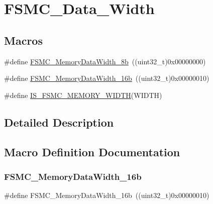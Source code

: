\hypertarget{group___f_s_m_c___data___width}{}\section{F\+S\+M\+C\+\_\+\+Data\+\_\+\+Width}
\label{group___f_s_m_c___data___width}
\subsection*{Macros}
\begin{DoxyCompactItemize}
\item 
\#define \mbox{\hyperlink{group___f_s_m_c___data___width_ga5753e089830f19af70a724766e3c329f}{F\+S\+M\+C\+\_\+\+Memory\+Data\+Width\+\_\+8b}}~((uint32\+\_\+t)0x00000000)
\item 
\#define \mbox{\hyperlink{group___f_s_m_c___data___width_ga65d85c3072e6790ae760ca2248e46df6}{F\+S\+M\+C\+\_\+\+Memory\+Data\+Width\+\_\+16b}}~((uint32\+\_\+t)0x00000010)
\item 
\#define \mbox{\hyperlink{group___f_s_m_c___data___width_ga003d52b62f5950fb041f73f15ce20171}{I\+S\+\_\+\+F\+S\+M\+C\+\_\+\+M\+E\+M\+O\+R\+Y\+\_\+\+W\+I\+D\+TH}}(W\+I\+D\+TH)
\end{DoxyCompactItemize}


\subsection{Detailed Description}


\subsection{Macro Definition Documentation}
\mbox{\label{group___f_s_m_c___data___width_ga65d85c3072e6790ae760ca2248e46df6}} 
\subsubsection{\texorpdfstring{FSMC\_MemoryDataWidth\_16b}{FSMC\_MemoryDataWidth\_16b}}
{\footnotesize\ttfamily \#define F\+S\+M\+C\+\_\+\+Memory\+Data\+Width\+\_\+16b~((uint32\+\_\+t)0x00000010)}

\mbox{\label{group___f_s_m_c___data___width_ga5753e089830f19af70a724766e3c329f}} 
